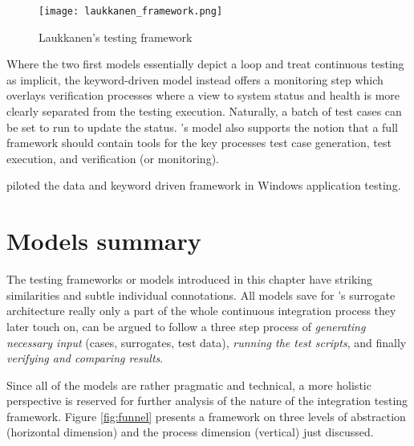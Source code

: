 \documentclass[12pt,a4paper,oneside,pdftex]{report}
\begin{document}
\begin{figure}[H]
  \begin{center}
    \texttt{[image: laukkanen\_framework.png]}
    \caption{Laukkanen's testing framework \citep{laukkanen2006data}}
    \label{fig:laukkanen} 
  \end{center}
\end{figure}

Where the two first models essentially depict a loop and treat continuous testing as implicit, the keyword-driven model instead offers a monitoring step which overlays verification processes where a view to system status and health is more clearly separated from the testing execution. Naturally, a batch of test cases can be set to run to update the status. \citeauthor{laukkanen2006data}'s \citeyearpar{laukkanen2006data} model also supports the notion that a full framework should contain tools for the key processes test case generation, test execution, and verification (or monitoring).

\citet{laukkanen2006data} piloted the data and keyword driven framework in Windows application testing.

\section{Models summary}

The testing frameworks or models introduced in this chapter have striking similarities and subtle individual connotations. All models save for \citeauthor{huang2008surrogate}'s \citeyearpar{huang2008surrogate} surrogate architecture really only a part of the whole continuous integration process they later touch on, can be argued to follow a three step process of \emph{generating necessary input} (cases, surrogates, test data), \emph{running the test scripts}, and finally \emph{verifying and comparing results}. 

Since all of the models are rather pragmatic and technical, a more holistic perspective is reserved for further analysis of the nature of the integration testing framework. Figure \ref{fig:funnel} presents a framework on three levels of abstraction (horizontal dimension) and the process dimension (vertical) just discussed.
\end{document}
